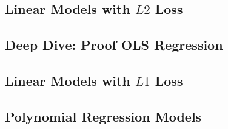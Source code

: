 

\subsection{Linear Models with $L2$ Loss}


\subsection{Deep Dive: Proof OLS Regression}


\subsection{Linear Models with $L1$ Loss}


\subsection{Polynomial Regression Models}

